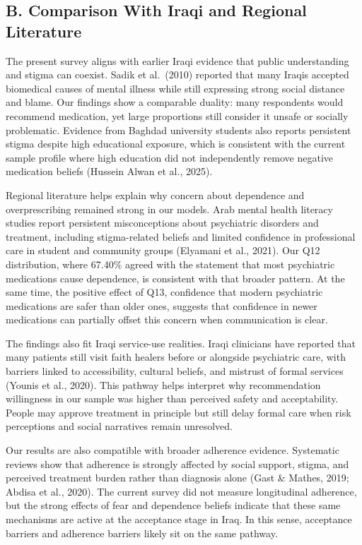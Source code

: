 \subsection{B. Comparison With Iraqi and Regional
Literature}\label{b.-comparison-with-iraqi-and-regional-literature}

The present survey aligns with earlier Iraqi evidence that public
understanding and stigma can coexist. Sadik et al.~(2010) reported that
many Iraqis accepted biomedical causes of mental illness while still
expressing strong social distance and blame. Our findings show a
comparable duality: many respondents would recommend medication, yet
large proportions still consider it unsafe or socially problematic.
Evidence from Baghdad university students also reports persistent stigma
despite high educational exposure, which is consistent with the current
sample profile where high education did not independently remove
negative medication beliefs (Hussein Alwan et al., 2025).

Regional literature helps explain why concern about dependence and
overprescribing remained strong in our models. Arab mental health
literacy studies report persistent misconceptions about psychiatric
disorders and treatment, including stigma-related beliefs and limited
confidence in professional care in student and community groups
(Elyamani et al., 2021). Our Q12 distribution, where 67.40\% agreed with
the statement that most psychiatric medications cause dependence, is
consistent with that broader pattern. At the same time, the positive
effect of Q13, confidence that modern psychiatric medications are safer
than older ones, suggests that confidence in newer medications can
partially offset this concern when communication is clear.

The findings also fit Iraqi service-use realities. Iraqi clinicians have
reported that many patients still visit faith healers before or
alongside psychiatric care, with barriers linked to accessibility,
cultural beliefs, and mistrust of formal services (Younis et al., 2020).
This pathway helps interpret why recommendation willingness in our
sample was higher than perceived safety and acceptability. People may
approve treatment in principle but still delay formal care when risk
perceptions and social narratives remain unresolved.

Our results are also compatible with broader adherence evidence.
Systematic reviews show that adherence is strongly affected by social
support, stigma, and perceived treatment burden rather than diagnosis
alone (Gast \& Mathes, 2019; Abdisa et al., 2020). The current survey
did not measure longitudinal adherence, but the strong effects of fear
and dependence beliefs indicate that these same mechanisms are active at
the acceptance stage in Iraq. In this sense, acceptance barriers and
adherence barriers likely sit on the same pathway.


